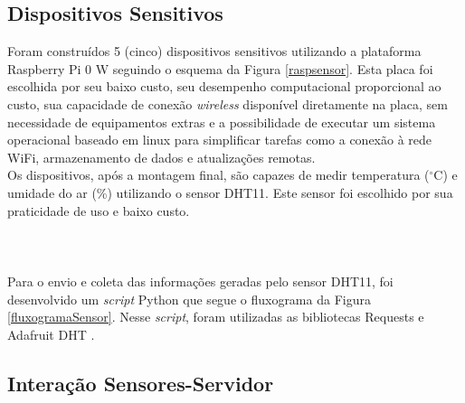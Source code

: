 \subsection{Dispositivos Sensitivos}
\quad Foram construídos 5 (cinco) dispositivos sensitivos utilizando a plataforma Raspberry Pi 0 W seguindo o esquema da Figura \ref{raspsensor}. Esta placa
foi escolhida por seu baixo custo, seu desempenho computacional proporcional ao custo, sua capacidade de conexão \textit{wireless} disponível diretamente na placa, sem necessidade de equipamentos extras e a possibilidade de executar um sistema operacional baseado em linux para simplificar tarefas como a conexão à rede WiFi, armazenamento de dados e atualizações remotas.
\\\null \quad Os dispositivos, após a montagem final, são capazes de medir temperatura ($^\circ$C) e umidade do ar (\%) utilizando o sensor DHT11. Este sensor foi escolhido
por sua praticidade de uso e baixo custo.
\\\\\\
\\\null \quad Para o envio e coleta das informações geradas pelo sensor DHT11, foi desenvolvido um \textit{script} Python que segue o fluxograma da Figura \ref{fluxogramaSensor}. Nesse \textit{script}, foram utilizadas as bibliotecas Requests \cite{Requests} e Adafruit DHT \cite{AdafruitDHT}.

\newpage
\subsection{Interação Sensores-Servidor}

